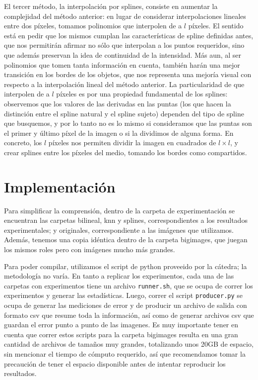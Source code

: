 \documentclass{article}
\begin{document}
El tercer método, la interpolación por splines, consiste en aumentar la complejidad del método anterior: en lugar de considerar interpolaciones lineales entre dos píxeles, tomamos polinomios que interpolen de a $l$ píxeles. El sentido está en pedir que los mismos cumplan las características de spline definidas antes, que nos permitirán afirmar no sólo que interpolan a los puntos requeridos, sino que además preservan la idea de continuidad de la intensidad. Más aun, al ser polinomios que tomen tanta información en cuenta, también harán una mejor transición en los bordes de los objetos, que nos representa una mejoría visual con respecto a la interpolación lineal del método anterior. La particularidad de que interpolen de a $l$ píxeles es por una propiedad fundamental de los splines: observemos que los valores de las derivadas en las puntas (los que hacen la distinción entre el spline natural y el spline sujeto) dependen del tipo de spline que busquemos, y por lo tanto no es lo mismo si consideramos que las puntas son el primer y último píxel de la imagen o si la dividimos de alguna forma. En concreto, los $l$ píxeles nos permiten dividir la imagen en cuadrados de $l \times l$, y crear splines entre los píxeles del medio, tomando los bordes como compartidos.

\section{Implementación}

Para simplificar la comprensión, dentro de la carpeta de experimentación se encuentran las carpetas bilineal, knn y splines, correspondientes a los resultados experimentales; y originales, correspondiente a las imágenes que utilizamos. Además, tenemos una copia idéntica dentro de la carpeta bigimages, que juegan los mismos roles pero con imágenes mucho más grandes.

Para poder compilar, utilizamos el script de python proveeido por la cátedra; la metodología no varía. En tanto a replicar los experimentos, cada una de las carpetas con experimentos tiene un archivo \texttt{runner.sh}, que se ocupa de correr los experimentos y generar las estadísticas. Luego, correr el script \texttt{producer.py} se ocupa de generar las mediciones de error y de producir un archivo de salida con formato csv que resume toda la información, así como de generar archivos csv que guardan el error punto a punto de las imagenes. Es muy importante tener en cuenta que correr estos scripts para la carpeta bigimages resulta en una gran cantidad de archivos de tamaños muy grandes, totalizando unos 20GB de espacio, sin mencionar el tiempo de cómputo requerido, así que recomendamos tomar la precaución de tener el espacio disponible antes de intentar reproducir los resultados.
\end{document}
